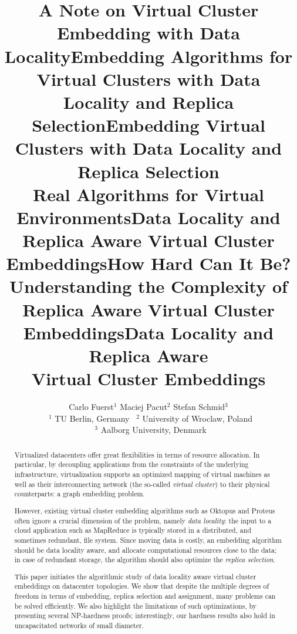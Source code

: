 \documentclass[preprint,12pt]{elsarticle}
\title{A Note on Virtual Cluster Embedding with Data Locality}
\title{Embedding Algorithms for Virtual Clusters with Data Locality and Replica Selection}
\title{Embedding Virtual Clusters with Data Locality and Replica Selection\\{\Large Real Algorithms for Virtual Environments}}
\title{Data Locality and Replica Aware Virtual Cluster Embeddings}
\title{How Hard Can It Be?\\{\Large Understanding the Complexity of  
Replica Aware Virtual Cluster Embeddings}}
\begin{document}
\begin{frontmatter}

\title{Data Locality and Replica Aware\\Virtual Cluster Embeddings}


\author{Carlo Fuerst$^{1}$ \quad Maciej Pacut$^{2}$ \quad Stefan Schmid$^3$\\
{\small~$^1$ TU Berlin, Germany \quad~$^2$ University of Wroclaw, Poland \\~$^3$ 
Aalborg University, Denmark}}


\begin{abstract}
Virtualized datacenters offer great flexibilities in terms of resource allocation. In particular, by
decoupling applications from the constraints of the underlying infrastructure, virtualization
supports an optimized mapping of virtual machines as well as their interconnecting network
 (the so-called \emph{virtual cluster})
to their
physical counterparts: a graph embedding problem.

However, existing virtual cluster embedding algorithms such as Oktopus and Proteus
often ignore a crucial dimension of the problem, namely \emph{data locality}:
the input to a cloud application such as MapReduce is typically stored in a distributed,
and sometimes redundant, file system. Since moving
data is costly, an embedding algorithm should be data locality aware,
and allocate computational resources close to the data; in case of redundant storage, the algorithm should also optimize the \emph{replica selection}.

This paper initiates the algorithmic study of data locality aware virtual cluster embeddings
on datacenter topologies.
We
show that
despite the multiple degrees of freedom in terms of embedding, replica selection and assignment,
many problems can be
solved efficiently. We also highlight the limitations of such optimizations,
by presenting several NP-hardness proofs; interestingly,
our hardness results also hold in uncapacitated networks of small diameter.
\end{abstract}

\end{frontmatter}

\sloppy

\end{document}

